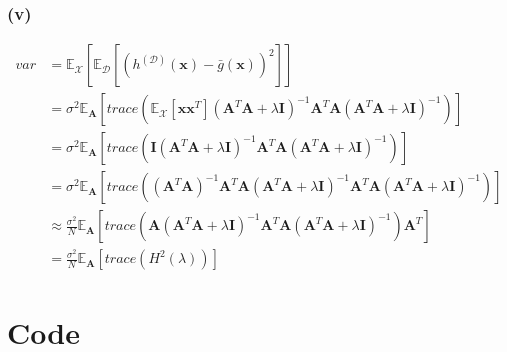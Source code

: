 \documentclass[11pt]{article}
\begin{document}
\subsubsection*{(v)}
\begin{equation}
\begin{split}
var &= \mathbb{E}_{\mathcal{X}} [\mathbb{E}_{\mathcal{D}}[(h^{(\mathcal{D})}(\pmb{x})-\bar{g}(\pmb{x}))^2]]\\
&=\sigma^2\mathbb{E}_{\pmb{A}}[trace(\mathbb{E}_{\mathcal{X}}[\pmb{x}\pmb{x}^T](\pmb{A}^T\pmb{A}+\lambda\pmb{I})^{-1}\pmb{A}^T\pmb{A}(\pmb{A}^T\pmb{A}+\lambda\pmb{I})^{-1})]\\
&=\sigma^2\mathbb{E}_{\pmb{A}}[trace(\pmb{I}(\pmb{A}^T\pmb{A}+\lambda\pmb{I})^{-1}\pmb{A}^T\pmb{A}(\pmb{A}^T\pmb{A}+\lambda\pmb{I})^{-1})]\\
&=\sigma^2\mathbb{E}_{\pmb{A}}[trace((\pmb{A}^T\pmb{A})^{-1}\pmb{A}^T\pmb{A}(\pmb{A}^T\pmb{A}+\lambda\pmb{I})^{-1}\pmb{A}^T\pmb{A}(\pmb{A}^T\pmb{A}+\lambda\pmb{I})^{-1})]\\
&\approx\frac{\sigma^2}{N}\mathbb{E}_{\pmb{A}}[trace(\pmb{A}(\pmb{A}^T\pmb{A}+\lambda\pmb{I})^{-1}\pmb{A}^T\pmb{A}(\pmb{A}^T\pmb{A}+\lambda\pmb{I})^{-1})\pmb{A}^T]\\
&=\frac{\sigma^2}{N}\mathbb{E}_{\pmb{A}}[trace(H^2(\lambda))]
\end{split}
\end{equation}
\pagebreak
\section*{Code}
\inputminted[breaklines]{python}{./py/exercise1.py}
\end{document}

